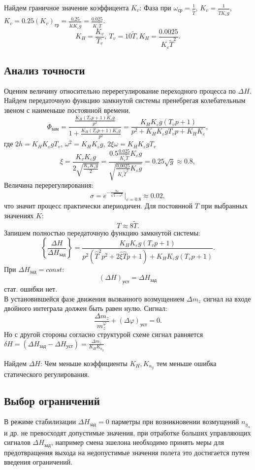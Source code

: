 \documentclass{article}
\begin{document}
Найдем граничное значение коэффицента $K_v$:
Фаза при $\omega_\text{ср} = \frac{1}{\tilde{T}} $, $K_v = \frac{1}{\tilde{T} K_\varepsilon g}$, $K_v = 0.25 (K_v)_\text{гр} = \frac{0.25}{\tilde{K}  K_\varepsilon g} = \frac{0.025}{K_\varepsilon \tilde{T}}$.
\[
	K_H = \frac{K_v}{T_v}, \ T_v = 10 \tilde{T}, K_H = \frac{0.0025}{K_\varepsilon \tilde{T}^2}
	.\]

\subsection{Анализ точности}
Оценим величину относительно перерегулирование переходного процесса по $\Delta H$. Найдем передаточную функцию замкнутой системы пренебрегая колебательным звеном с наименьше постоянной времени.
\[
	\Phi_\text{зам} = \frac{\frac{K_H(T_v p + 1) K_\varepsilon g}{p^2}}{1 + \frac{K_H(T_v p + 1) K_\varepsilon g}{p^2}} = \frac{K_H K_\varepsilon g(T_v p + 1)}{ p^2 +  K_H K_\varepsilon g T_v p +  K_H K_\varepsilon}
	,\]
где $2h = K_H K_\varepsilon g T_v$, $\omega^2 = K_H K_\varepsilon g$, $2 \xi \omega = K_H K_\varepsilon g T_v$
\[
	\xi = \frac{K_v K_\varepsilon g}{2 \sqrt{\frac{K_v K_\varepsilon g}{2}}} = \frac{0.5 \frac{0.025}{K_\varepsilon \tilde{T}} K_\varepsilon g}{\sqrt{\frac{0.0025}{K_\varepsilon \tilde{T}^2} K_\varepsilon  g}} = 0.25 \sqrt{g} \approx 0.8,
\]
Величина перерегулирования:
\[
	\sigma = e^{- \frac{\pi \varepsilon}{\sqrt{1 - \varepsilon^2}}} |_{\varepsilon = 0.8} \approx 0.02,
\]
что значит процесс практически апериодичен. Для постоянной $T$ при выбранных значениях $K$:
\[
	T \approx 8 \tilde{T}
	.\]
Запишем полностью передаточную функцию замкнутой системы:
\[
	\left\{ \frac{\Delta H }{\Delta H_\text{зад}} \right\}  = \frac{K_H K_\varepsilon g (T_v p + 1)}{p^2 (\hat{T}^2 p^2 + 2 \hat{\xi} \hat{T}p + 1) + K_H K_\varepsilon g (T_v p +1)}.
\]
При $\Delta H_\text{зад} = const$:
\[
	(\Delta H)_\text{уст} = \Delta H_\text{зад}
\]
стат. ошибки нет.\\
В установившейся фазе движения вызванного возмущением $ \Delta m_z $ сигнал на входе двойного интеграла должен быть равен нулю.
Сигнал:
\[
	\frac{\Delta m_z}{m_z^\varphi} + (\Delta \varphi)_\text{уст} = 0   
	.\]
Но с другой стороны согласно структурой схеме сигнал равняется $\delta H = (\Delta H_\text{зад} - \Delta H_\text{уст}) = \frac{\Delta m_z}{K_H K_{n_y}}$

Найдем $\Delta H$:
Чем меньше коэффициенты $K_H, K_{n_y}$ тем меньше ошибка статического регулирования.

\subsection{Выбор ограничений}
В режиме стабилизации $\Delta H_\text{зад} = 0$ парметры при возникновении возмущений $n_{y_\alpha}$ и др. не превосходят допустимые значения, при отработке больших управляющих сигналов $\Delta H_\text{зад}$, например смена эшелона необходимо принять меры для предотвращения выхода на недопустимые значения полета это достигается путем введения ограничений.    
\end{document}

